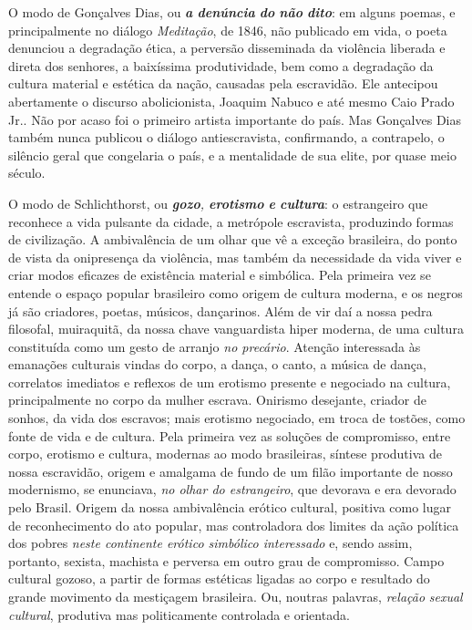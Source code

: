 O modo de Gonçalves Dias, ou \emph{\textbf{a} \textbf{denúncia}
\textbf{do} \textbf{não} \textbf{dito}}: em alguns poemas, e
principalmente no diálogo \emph{Meditação}, de 1846, não publicado em
vida, o poeta denunciou a degradação ética, a perversão disseminada da
violência liberada e direta dos senhores, a baixíssima produtividade,
bem como a degradação da cultura material e estética da nação, causadas
pela escravidão. Ele antecipou abertamente o discurso abolicionista,
Joaquim Nabuco e até mesmo Caio Prado Jr.. Não por acaso foi o primeiro
artista importante do país. Mas Gonçalves Dias também nunca publicou o
diálogo antiescravista, confirmando, a contrapelo, o silêncio geral que
congelaria o país, e a mentalidade de sua elite, por quase meio século.

O modo de Schlichthorst, ou \emph{\textbf{gozo}, \textbf{erotismo}
\textbf{e} \textbf{cultura}}: o estrangeiro que reconhece a vida
pulsante da cidade, a metrópole escravista, produzindo formas de
civilização. A ambivalência de um olhar que vê a exceção brasileira, do
ponto de vista da onipresença da violência, mas também da necessidade da
vida viver e criar modos eficazes de existência material e simbólica.
Pela primeira vez se entende o espaço popular brasileiro como origem de
cultura moderna, e os negros já são criadores, poetas, músicos,
dançarinos. Além de vir daí a nossa pedra filosofal, muiraquitã, da
nossa chave vanguardista hiper moderna, de uma cultura constituída como
um gesto de arranjo \emph{no precário}. Atenção interessada às emanações
culturais vindas do corpo, a dança, o canto, a música de dança,
correlatos imediatos e reflexos de um erotismo presente e negociado na
cultura, principalmente no corpo da mulher escrava. Onirismo desejante,
criador de sonhos, da vida dos escravos; mais erotismo negociado, em
troca de tostões, como fonte de vida e de cultura. Pela primeira vez as
soluções de compromisso, entre corpo, erotismo e cultura, modernas ao
modo brasileiras, síntese produtiva de nossa escravidão, origem e
amalgama de fundo de um filão importante de nosso modernismo, se
enunciava, \emph{no olhar do estrangeiro}, que devorava e era devorado
pelo Brasil. Origem da nossa ambivalência erótico cultural, positiva
como lugar de reconhecimento do ato popular, mas controladora dos
limites da ação política dos pobres \emph{neste continente erótico
simbólico interessado} e, sendo assim, portanto, sexista, machista e
perversa em outro grau de compromisso. Campo cultural gozoso, a partir
de formas estéticas ligadas ao corpo e resultado do grande movimento da
mestiçagem brasileira. Ou, noutras palavras, \emph{relação}
\emph{sexual} \emph{cultural}, produtiva mas politicamente controlada e
orientada.

